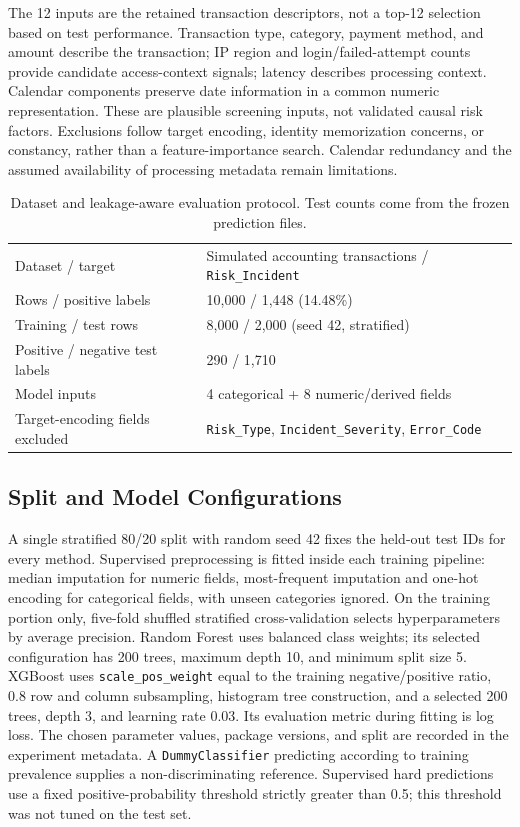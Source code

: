 \documentclass{llncs}
\begin{document}
The 12 inputs are the retained transaction descriptors, not a top-12 selection based on test performance. Transaction type, category, payment method, and amount describe the transaction; IP region and login/failed-attempt counts provide candidate access-context signals; latency describes processing context. Calendar components preserve date information in a common numeric representation. These are plausible screening inputs, not validated causal risk factors. Exclusions follow target encoding, identity memorization concerns, or constancy, rather than a feature-importance search. Calendar redundancy and the assumed availability of processing metadata remain limitations.

\begin{table}[t]
\caption{Dataset and leakage-aware evaluation protocol. Test counts come from the frozen prediction files.}\label{tab:data}
\centering\small
\begin{tabular}{ll}
\hline
Dataset / target & Simulated accounting transactions / \texttt{Risk\_Incident} \\
Rows / positive labels & 10,000 / 1,448 (14.48\%) \\
Training / test rows & 8,000 / 2,000 (seed 42, stratified) \\
Positive / negative test labels & 290 / 1,710 \\
Model inputs & 4 categorical + 8 numeric/derived fields \\
Target-encoding fields excluded & \texttt{Risk\_Type}, \texttt{Incident\_Severity}, \texttt{Error\_Code} \\
\hline
\end{tabular}
\end{table}

\subsection{Split and Model Configurations}

A single stratified 80/20 split with random seed 42 fixes the held-out test IDs for every method. Supervised preprocessing is fitted inside each training pipeline: median imputation for numeric fields, most-frequent imputation and one-hot encoding for categorical fields, with unseen categories ignored. On the training portion only, five-fold shuffled stratified cross-validation selects hyperparameters by average precision. Random Forest uses balanced class weights; its selected configuration has 200 trees, maximum depth 10, and minimum split size 5. XGBoost uses \texttt{scale\_pos\_weight} equal to the training negative/positive ratio, 0.8 row and column subsampling, histogram tree construction, and a selected 200 trees, depth 3, and learning rate 0.03. Its evaluation metric during fitting is log loss. The chosen parameter values, package versions, and split are recorded in the experiment metadata. A \texttt{DummyClassifier} predicting according to training prevalence supplies a non-discriminating reference. Supervised hard predictions use a fixed positive-probability threshold strictly greater than 0.5; this threshold was not tuned on the test set.
\end{document}
